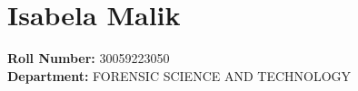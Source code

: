 \section*{Isabela Malik}
\textbf{Roll Number:} 30059223050 \\
\textbf{Department:} FORENSIC SCIENCE AND TECHNOLOGY


